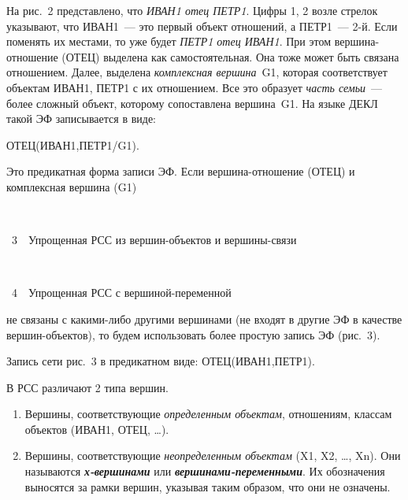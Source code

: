 \begin{multicols}{2}
 На рис.~2 представлено, что \textit{ИВАН1 отец ПЕТР1}.
Цифры 1, 2 возле стрелок указывают, что ИВАН1~--- это первый объект
отношений, а ПЕТР1~--- 2-й. Если поменять их местами, то уже будет
\textit{ПЕТР1 отец ИВАН1}. При этом вер\-ши\-на-от\-но\-ше\-ние (ОТЕЦ)
выделена как самостоятельная. Она тоже может быть связана отношением.
Далее, выделена \textit{комплексная вершина}~G1, которая соответствует
объектам ИВАН1, ПЕТР1 с их отношением. Все это образует \textit{часть
семьи}~--- более сложный объект, которому сопоставлена вершина~G1. На
языке ДЕКЛ такой ЭФ записывается в виде:
 \begin{center}
ОТЕЦ(ИВАН1,ПЕТР1/G1).
 \end{center}
 Это предикатная форма записи ЭФ. Если вер\-ши\-на-от\-но\-ше\-ние (ОТЕЦ) и
комплексная вершина (G1)\linebreak\vspace*{-12pt}

\noindent
\begin{center}  %
\mbox{%
\epsfxsize=76.56mm
}
  \end{center}
  \vspace*{2pt}

\noindent
{{\figurename~3}\ \ \small{Упрощенная РСС из вер\-шин-объ\-ек\-тов и вер\-ши\-ны-свя\-зи}}


\vspace*{6pt}



\begin{center}
\mbox{%
\epsfxsize=65.372mm
}


{{\figurename~4}\ \ \small{Упрощенная РСС с вер\-ши\-ной-пе\-ре\-мен\-ной}}
\end{center}

\addtocounter{figure}{2}

\vspace*{6pt}


\noindent
не связаны с какими-либо другими вершинами (не
входят в другие ЭФ в качестве вер\-шин-объ\-ек\-тов), то будем использовать
более простую запись ЭФ (рис.~3).



 Запись сети рис.~3 в предикатном виде: ОТЕЦ(ИВАН1,ПЕТР1).

 В РСС различают 2 типа вершин.
 \begin{enumerate}
\item Вершины, соответствующие \textit{определенным объектам},
отношениям, классам объектов (ИВАН1, ОТЕЦ, \ldots).
\item Вершины, соответствующие \textit{неопределенным объектам} (X1,
X2, \ldots, Xn). Они называются {\bfseries\textit{х-вер\-ши\-на\-ми}} или
{\bfseries\textit{вер\-ши\-на\-ми-пе\-ре\-мен\-ны\-ми}}. Их обозначения
выносятся за рамки вершин, указывая таким образом, что они не означены.
 \end{enumerate}



\end{multicols}
